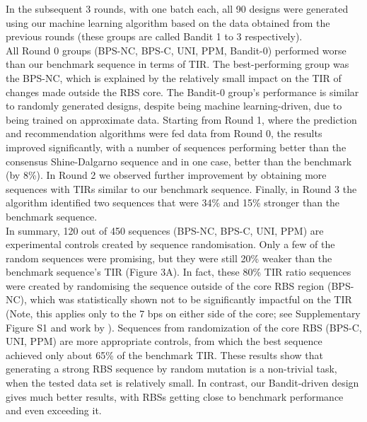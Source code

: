 \documentclass{scrartcl}[2013/05/29]%
\begin{document}
In the subsequent 3 rounds, with one batch each, all 90 designs were generated using our machine learning algorithm based on the data obtained from the previous rounds (these groups are called Bandit 1 to 3 respectively).\\

All Round 0 groups (BPS-NC, BPS-C, UNI, PPM, Bandit-0) performed worse than our benchmark sequence in terms of TIR.
The best-performing group was the BPS-NC, which is explained by the relatively small impact on the TIR of changes made outside the RBS core.
The Bandit-0 group's performance is similar to randomly generated designs, despite being machine learning-driven, due to being trained on approximate data.
Starting from Round 1, where the prediction and recommendation algorithms were fed data from Round 0, the results improved significantly, with a number of sequences performing better than the consensus Shine-Dalgarno sequence and in one case, better than the benchmark (by 8\%).
In Round 2 we observed further improvement by obtaining more sequences with TIRs similar to our benchmark sequence.
Finally, in Round 3 the algorithm identified two sequences that were 34\% and 15\% stronger than the benchmark sequence.\\

In summary, 120 out of 450 sequences (BPS-NC, BPS-C, UNI, PPM) are experimental controls created by sequence randomisation.
Only a few of the random sequences were promising, but they were still 20\% weaker than the benchmark sequence's TIR (Figure 3A).
In fact, these 80\% TIR ratio sequences were created by randomising the sequence outside of the core RBS region (BPS-NC), which was statistically shown not to be significantly impactful on the TIR (Note, this applies only to the 7 bps on either side of the core; see Supplementary Figure S1 and work by \mbox{\textcite{Jeschek2016}}). Sequences from randomization of the core RBS (BPS-C, UNI, PPM) are more appropriate controls, from which the best sequence achieved only about 65\% of the benchmark TIR.
These results show that generating a strong RBS sequence by random mutation is a non-trivial task, when the tested data set is relatively small.
In contrast, our Bandit-driven design gives much better results, with RBSs getting close to benchmark performance and even exceeding it.\\
\end{document}
